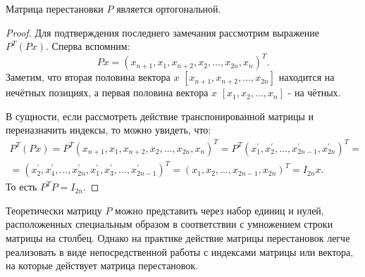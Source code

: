 \begin{claim}
    Матрица перестановки \(P\) является ортогональной.
\end{claim}
\begin{proof}
    Для подтверждения последнего замечания рассмотрим выражение \(P^T(Px)\). Сперва вспомним: 
    \begin{equation}
        Px=(x_{n+1},x_1, x_{n+2},x_2,\dots,x_{2n},x_n)^T.
    \end{equation}
    Заметим, что вторая половина вектора \(x\) \([x_{n+1},x_{n+2},\dots,x_{2n}]\) находится на нечётных позициях, а первая половина вектора  \(x\) \([x_{1},x_{2},\dots,x_{n}]\) - на чётных. 

    В сущности, если рассмотреть действие транспонированной матрицы и переназначить индексы, то можно увидеть, что:
    \begin{equation*}
        \begin{split}
            P^T(Px)=P^T(x_{n+1},x_1, x_{n+2},x_2,\dots,x_{2n},x_n)^T=P^T(x_{1}^\prime,x_2^\prime,\dots,x_{2n-1}^\prime,x_{2n}^\prime)^T=\\[6pt]=(x_2^\prime,x_4^\prime,\dots,x_{2n}^\prime,x_1^\prime,x_3^\prime,\dots,x_{2n-1}^\prime)^T=(x_{1},x_2,\dots,x_{2n-1},x_{2n})^T=I_{2n}x. 
        \end{split}
    \end{equation*}
    То есть \(P^TP=I_{2n}\).
\end{proof}

\begin{note}
    Теоретически матрицу \(P\) можно представить через набор единиц и нулей, расположенных специальным образом в соответствии с умножением строки матрицы на столбец. Однако на практике действие матрицы перестановок легче реализовать в виде непосредственной работы с индексами матрицы или вектора, на которые действует матрица перестановок.   
\end{note}

